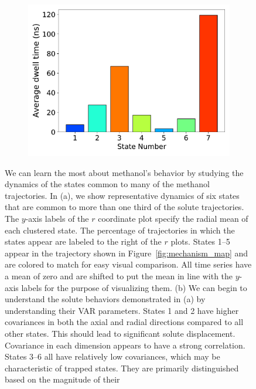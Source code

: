 \documentclass[journal=jpcbfk,manuscript=article]{achemso}
\begin{document}
\begin{figure}
\begin{subfigure}{0.35\textwidth}
  \includegraphics[width=\textwidth]{dwell_times_MET.pdf}  %
  \caption{}\label{fig:dwell_times_MET}
  \end{subfigure}
  \caption{We can learn the most about methanol's behavior by studying the dynamics
  of the states common to many of the methanol trajectories. In (a), we show representative
  dynamics of six states that are common to more than one third of the solute trajectories. 
  The $y$-axis labels of the $r$ coordinate plot specify the radial mean of each clustered 
  state. The percentage of trajectories in which the states appear are labeled to the right of
  the $r$ plots. States 1--5 appear in the trajectory shown in Figure~\ref{fig:mechanism_map}
  and are colored to match for easy visual comparison. All time series have a mean of zero and are
  shifted to put the mean in line with the $y$-axis labels for the purpose of visualizing them. 
  (b) We can begin to understand the solute behaviors demonstrated in (a) by understanding their VAR 
  parameters. States 1 and 2 have higher covariances in both the axial and radial directions compared
  to all other states. This should lead to significant solute displacement. Covariance in each dimension
  appears to have a strong correlation. 
  States 3--6 all have relatively low covariances, which may
  be characteristic of trapped states. They are primarily distinguished based on the magnitude of their 
}
\end{figure}
\end{document}
